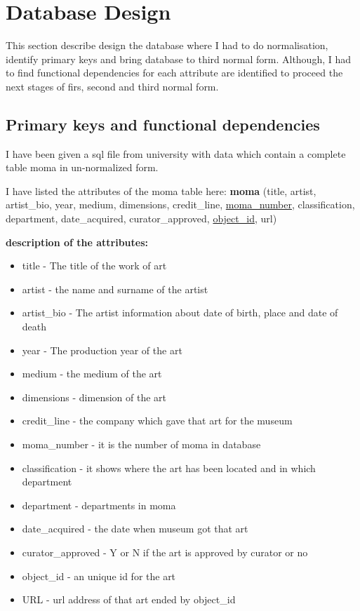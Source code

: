 \documentclass[journal,transmag]{IEEEtran}
\begin{document}
\section{Database Design}

This section describe design the database where I had to do normalisation, identify primary keys and bring database to third normal form. Although, I had to find functional dependencies for each attribute are identified to proceed the next stages of firs, second and third normal form.
\newline

\subsection {Primary keys and functional dependencies}


I have been given a sql file from university with data which contain a complete table moma in un-normalized form. 

I have listed the attributes of the moma table here:
\textbf{moma} (title, artist, artist\_bio, year, medium, dimensions, credit\_line, \underline{moma\_number}, classification, department, date\_acquired, curator\_approved, \underline{object\_id}, url)

\textbf{description of the attributes:}

\begin{itemize}
	\item title - The title of the work of art
	\item artist - the name and surname of the artist 
	\item artist\_bio - The artist information about date of birth, place and date of death 
	\item year - The production year of the art
	\item medium - the medium of the art
	\item dimensions - dimension of the art
	\item credit\_line - the company which gave that art for the museum
	\item moma\_number - it is the number of moma in database
	\item classification - it shows where the art has been located and in which department
	\item department - departments in moma
	\item date\_acquired  - the date when museum got that art
	\item curator\_approved - Y or N if the art is approved by curator or no
	\item object\_id - an unique id for the art
	\item URL - url address of that art ended by object\_id
\end{itemize}
\end{document}
